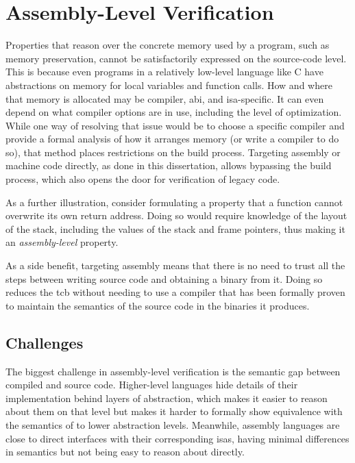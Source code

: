 \section{Assembly-Level Verification}
Properties that reason over the concrete memory used by a program,
such as memory preservation, cannot be satisfactorily expressed on the source-code level.
This is because even programs in a relatively low-level language like C
have abstractions on memory for local variables and function calls.
How and where that memory is allocated may be compiler, \ac{abi}, and \ac{isa}-specific.
It can even depend on what compiler options are in use,
including the level of optimization.
While one way of resolving that issue would be to choose a specific compiler
and provide a formal analysis of how it arranges memory (or write a compiler to do so),
that method places restrictions on the build process.
Targeting assembly or machine code directly, as done in this dissertation,
allows bypassing the build process,
which also opens the door for verification of legacy code.
\begin{example}\label{ex:rop}
  As a further illustration, consider formulating a property
  that a function cannot overwrite its own return address.
  Doing so would require knowledge of the layout of the stack,
  including the values of the stack and frame pointers,
  thus making it an \emph{assembly-level} property.
\end{example}
As a side benefit,
targeting assembly means that there is no need to trust all the steps between
writing source code and obtaining a binary from it.
Doing so reduces the \ac{tcb} without needing to use a compiler
that has been formally proven to maintain
the semantics of the source code in the binaries it produces.

\subsection{Challenges}\label{asm_challenges}
The biggest challenge in assembly-level verification is
the semantic gap between compiled and source code.
Higher-level languages hide details of their implementation
behind layers of abstraction, which makes it easier to reason about them on that level
but makes it harder to formally show equivalence with the semantics of
to lower abstraction levels.
Meanwhile, assembly languages are close to direct interfaces
with their corresponding \acp{isa},
having minimal differences in semantics but not being easy to reason about directly.

